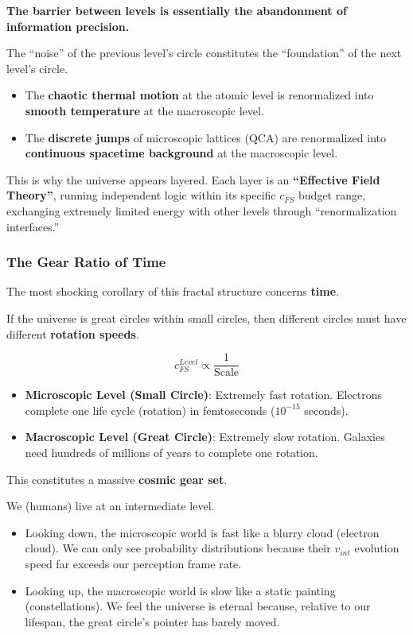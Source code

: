 \textbf{The barrier between levels is essentially the abandonment of information precision.}

The ``noise'' of the previous level's circle constitutes the ``foundation'' of the next level's circle.

\begin{itemize}
\item The \textbf{chaotic thermal motion} at the atomic level is renormalized into \textbf{smooth temperature} at the macroscopic level.

\item The \textbf{discrete jumps} of microscopic lattices (QCA) are renormalized into \textbf{continuous spacetime background} at the macroscopic level.
\end{itemize}

This is why the universe appears layered. Each layer is an \textbf{``Effective Field Theory''}, running independent logic within its specific $c_{FS}$ budget range, exchanging extremely limited energy with other levels through ``renormalization interfaces.''

\subsubsection{The Gear Ratio of Time}

The most shocking corollary of this fractal structure concerns \textbf{time}.

If the universe is great circles within small circles, then different circles must have different \textbf{rotation speeds}.

\[c_{FS}^{Level} \propto \frac{1}{\text{Scale}}\]

\begin{itemize}
\item \textbf{Microscopic Level (Small Circle)}: Extremely fast rotation. Electrons complete one life cycle (rotation) in femtoseconds ($10^{-15}$ seconds).

\item \textbf{Macroscopic Level (Great Circle)}: Extremely slow rotation. Galaxies need hundreds of millions of years to complete one rotation.
\end{itemize}

This constitutes a massive \textbf{cosmic gear set}.

We (humans) live at an intermediate level.

\begin{itemize}
\item Looking down, the microscopic world is fast like a blurry cloud (electron cloud). We can only see probability distributions because their $v_{int}$ evolution speed far exceeds our perception frame rate.

\item Looking up, the macroscopic world is slow like a static painting (constellations). We feel the universe is eternal because, relative to our lifespan, the great circle's pointer has barely moved.
\end{itemize}

